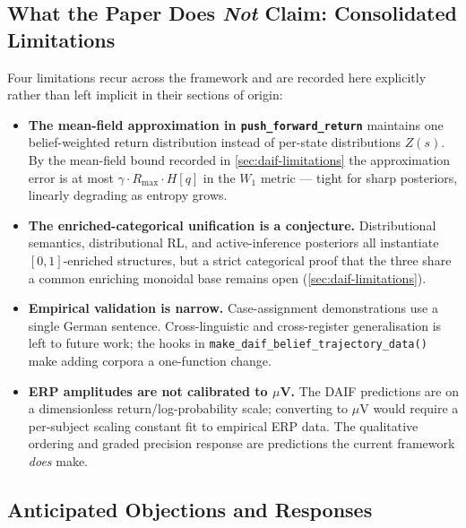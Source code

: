 \documentclass[
]{article}
\providecommand{\tightlist}{%
  \setlength{\itemsep}{0pt}\setlength{\parskip}{0pt}}
\begin{document}
\subsection{\texorpdfstring{What the Paper Does \emph{Not} Claim:
Consolidated
Limitations}{What the Paper Does Not Claim: Consolidated Limitations}}\label{what-the-paper-does-not-claim-consolidated-limitations}

Four limitations recur across the framework and are recorded here
explicitly rather than left implicit in their sections of origin:

\begin{itemize}
\tightlist
\item
  \textbf{The mean-field approximation in
  \texttt{push\_forward\_return}} maintains one belief-weighted return
  distribution instead of per-state distributions \(Z(s)\). By the
  mean-field bound recorded in \autoref{sec:daif-limitations} the
  approximation error is at most \(\gamma \cdot R_{\max} \cdot H[q]\) in
  the \(W_1\) metric --- tight for sharp posteriors, linearly degrading
  as entropy grows.
\item
  \textbf{The enriched-categorical unification is a conjecture.}
  Distributional semantics, distributional RL, and active-inference
  posteriors all instantiate \([0,1]\)-enriched structures, but a strict
  categorical proof that the three share a common enriching monoidal
  base remains open (\autoref{sec:daif-limitations}).
\item
  \textbf{Empirical validation is narrow.} Case-assignment
  demonstrations use a single German sentence. Cross-linguistic and
  cross-register generalisation is left to future work; the hooks in
  \texttt{make\_daif\_belief\_trajectory\_data()} make adding corpora a
  one-function change.
\item
  \textbf{ERP amplitudes are not calibrated to \texorpdfstring{\ensuremath{\mu}}{mu}V.} The DAIF predictions
  are on a dimensionless return/log-probability scale; converting to \texorpdfstring{\ensuremath{\mu}}{mu}V
  would require a per-subject scaling constant fit to empirical ERP
  data. The qualitative ordering and graded precision response are
  predictions the current framework \emph{does} make.
\end{itemize}

\subsection{Anticipated Objections and
Responses}\label{sec:reviewer-objections}
\end{document}
